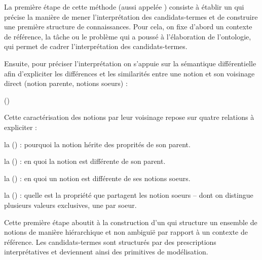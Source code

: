\g{[1.]} La première étape de cette méthode (aussi appelée ) consiste à établir un   qui précise la manière de mener l'interprétation des candidats-termes et de construire une première structure de connaissances. 
Pour cela, on fixe d'abord un contexte de référence, la tâche ou le problème qui a poussé à l'élaboration de l'ontologie, qui permet de cadrer l'interprétation des candidats-termes.

Ensuite, pour préciser l'interprétation on s'appuie sur la sémantique différentielle afin d'expliciter les différences et les similarités entre une notion et son voisinage direct (notion parente, notions soeurs) : 

	 (\cite[p.139]{bachimont:icc})

Cette caractérisation des notions par leur voisinage repose sur quatre relations à expliciter : 
\begin{liste}
	\item la  () : pourquoi la notion hérite des proprités de son parent.
	\item la  () : en quoi la notion est différente de son parent.
	\item la  () : en quoi un notion est différente de ses notions soeurs.
	\item la  () : quelle est la propriété que partagent les notion soeurs -- dont on distingue plusieurs valeurs exclusives, une par soeur.\\ 		
\end{liste}

Cette première étape aboutit à la construction d'un  qui structure un ensemble de notions de manière hiérarchique et non ambiguië par rapport à un contexte de référence.
Les candidats-termes sont structurés par des prescriptions interprétatives et deviennent ainsi des primitives de modélisation.\\

